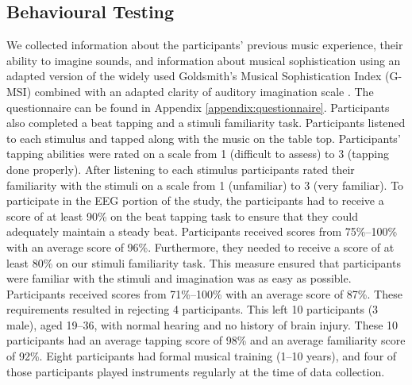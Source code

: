 \subsection{Behavioural Testing}
We collected information about the participants' previous music experience, their ability to imagine sounds, and information about musical sophistication using an adapted version of the widely used Goldsmith's Musical Sophistication Index (G-MSI) \cite{mullensiefen_musicality_2014} combined with an adapted clarity of auditory imagination scale \cite{willander_imagery_scale_2010}. 
The questionnaire can be found in Appendix \ref{appendix:questionnaire}.
Participants also completed a beat tapping and a stimuli familiarity task. 
Participants listened to each stimulus and tapped along with the music on the table top. 
Participants'  tapping abilities were rated on a scale from 1 (difficult to assess) to 3 (tapping done properly). 
After listening to each stimulus participants rated their familiarity with the stimuli on a scale from 1 (unfamiliar) to 3 (very familiar).
To participate in the \ac{EEG} portion of the study, the participants had to receive a score of at least 90\% on the beat tapping task to ensure that they could adequately maintain a steady beat.
Participants received scores from 75\%--100\% with an average score of 96\%.
Furthermore, they needed to receive a score of at least 80\% on our stimuli familiarity task. 
This measure ensured that participants were familiar with the stimuli and imagination was as easy as possible. 
Participants received scores from 71\%--100\% with an average score of 87\%.
These requirements resulted in rejecting 4 participants.
This left 10 participants (3 male), aged 19--36, with normal hearing and no history of brain injury. 
These 10 participants had an average tapping score of 98\% and an average familiarity score of 92\%.
Eight participants had formal musical training (1--10 years), and four of those participants played instruments regularly at the time of data collection.

